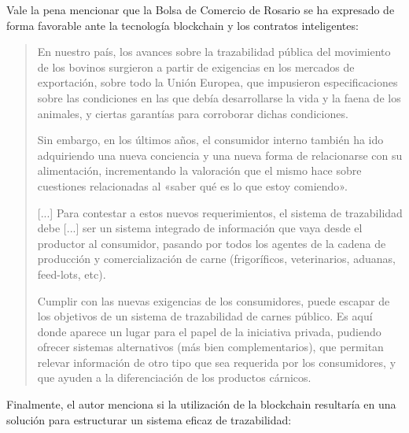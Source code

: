 \documentclass[12pt,a4paper,twoside]{book}
\begin{document}
Vale la pena mencionar que la Bolsa de Comercio de Rosario se ha expresado de forma favorable ante la tecnología blockchain y los contratos inteligentes:

\begin{quotation}
En nuestro país, los avances sobre la trazabilidad pública del movimiento de los bovinos surgieron a partir de exigencias en los mercados de exportación, sobre todo la Unión Europea, que impusieron especificaciones sobre las condiciones en las que debía desarrollarse la vida y la faena de los animales, y ciertas garantías para corroborar dichas condiciones. 

Sin embargo, en los últimos años, el consumidor interno también ha ido adquiriendo una nueva conciencia y una nueva forma de relacionarse con su alimentación, incrementando la valoración que el mismo hace sobre cuestiones relacionadas al «saber qué es lo que estoy comiendo».

[...] Para contestar a estos nuevos requerimientos, el sistema de trazabilidad debe [...] ser un sistema integrado de información que vaya desde el productor al consumidor, pasando por todos los agentes de la cadena de producción y comercialización de carne (frigoríficos, veterinarios, aduanas, feed-lots, etc).

Cumplir con las nuevas exigencias de los consumidores, puede escapar de los objetivos de un sistema de trazabilidad de carnes público. Es aquí donde aparece un lugar para el papel de la iniciativa privada, pudiendo ofrecer sistemas alternativos (más bien complementarios), que permitan relevar información de otro tipo que sea requerida por los consumidores, y que ayuden a la diferenciación de los productos cárnicos. \cite[págs. 16-17]{bolsacomercio}
\end{quotation}

Finalmente, el autor menciona si la utilización de la blockchain resultaría en una solución para estructurar un sistema eficaz de trazabilidad:
\end{document}
